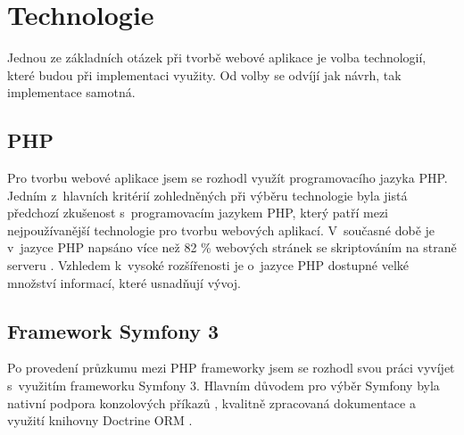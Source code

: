 \section{Technologie}
Jednou ze základních otázek při tvorbě webové aplikace je volba technologií, které budou při implementaci využity. Od volby se odvíjí jak návrh, tak implementace samotná. 

\subsection{PHP}
Pro tvorbu webové aplikace jsem se rozhodl využít programovacího jazyka \gls{PHP}. Jedním z~hlavních kritérií zohledněných při výběru technologie byla jistá předchozí zkušenost s~programovacím jazykem PHP, který patří mezi nejpoužívanější technologie pro tvorbu webových aplikací. V~současné době je v~jazyce PHP napsáno více než 82 \% webových stránek se skriptováním na straně serveru \autocite{web:statistics}. Vzhledem k~vysoké rozšířenosti je o~jazyce PHP dostupné velké množství informací, které usnadňují vývoj. 

\subsection{Framework Symfony 3}
Po provedení průzkumu mezi PHP frameworky jsem se rozhodl svou práci vyvíjet s~využitím frameworku Symfony 3. Hlavním důvodem pro výběr Symfony byla nativní podpora konzolových příkazů \autocite{symfony:console}, kvalitně zpracovaná dokumentace a využití knihovny Doctrine \gls{ORM} \autocite{symfony:doctrine}.
